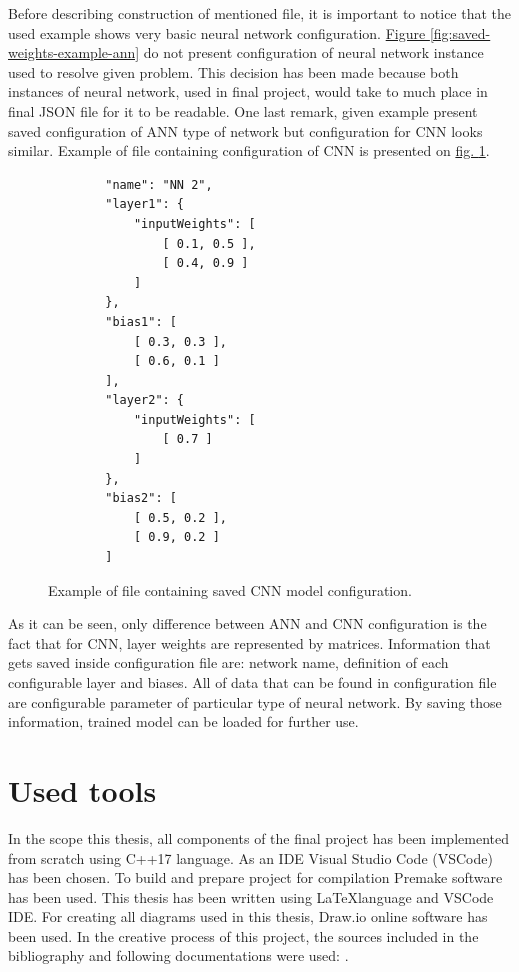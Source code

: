 Before describing construction of mentioned file, it is important to notice that the used example shows very basic neural network configuration. \hyperref[fig:saved-weights-example-ann]{Figure \ref*{fig:saved-weights-example-ann}} do not present configuration of neural network instance used to resolve given problem. This decision has been made because both instances of neural network, used in final project, would take to much place in final JSON file for it to be readable. One last remark, given example present saved configuration of ANN type of network but configuration for CNN looks similar. Example of file containing configuration of CNN is presented on \hyperref[fig:saved-weights-example-cnn]{fig. \ref*{fig:saved-weights-example-cnn}}.
\begin{figure}
	\centering
	\begin{lstlisting}
		"name": "NN 2",
		"layer1": {
			"inputWeights": [
				[ 0.1, 0.5 ],
				[ 0.4, 0.9 ]
			]
		},
		"bias1": [
			[ 0.3, 0.3 ],
			[ 0.6, 0.1 ]
		],
		"layer2": {
			"inputWeights": [
				[ 0.7 ]
			]
		},
		"bias2": [
			[ 0.5, 0.2 ],
			[ 0.9, 0.2 ]
		]
	\end{lstlisting}
	\caption{Example of file containing saved CNN model configuration.}
	\label{fig:saved-weights-example-cnn}
\end{figure}
As it can be seen, only difference between ANN and CNN configuration is the fact that for CNN, layer weights are represented by matrices. Information that gets saved inside configuration file are: network name, definition of each configurable layer and biases. All of data that can be found in configuration file are configurable parameter of particular type of neural network. By saving those information, trained model can be loaded for further use.

\section{Used tools}
In the scope this thesis, all components of the final project has been implemented from scratch using C++17 language. As an IDE Visual Studio Code (VSCode) has been chosen. To build and prepare project for compilation Premake software has been used. This thesis has been written using \LaTeX language and VSCode IDE. For creating all diagrams used in this thesis, Draw.io online software has been used. In the creative process of this project, the sources included in the bibliography and following documentations were used: \cite{bib:internet-c++-doc,bib:internet-latex-doc,bib:internet-vscode-doc,bib:internet-premake-doc}.

